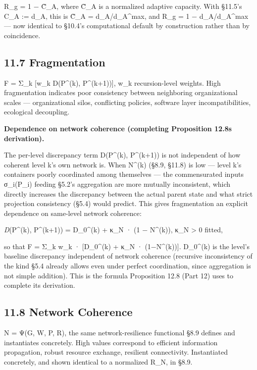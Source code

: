 \documentclass[
]{article}
\begin{document}
R\_g = 1 − C̃\_A, where C̃\_A is a normalized adaptive capacity. With
§11.5's C\_A := d\_A, this is C̃\_A = d\_A/d\_A\^{}max, and R\_g = 1 −
d\_A/d\_A\^{}max --- now identical to §10.4's computational default by
construction rather than by coincidence.

\hypertarget{fragmentation}{%
\subsection{11.7 Fragmentation}\label{fragmentation}}

F = Σ\_k {[}w\_k D(P\^{}(k), P\^{}(k+1)){]}, w\_k recursion-level
weights. High fragmentation indicates poor consistency between
neighboring organizational scales --- organizational silos, conflicting
policies, software layer incompatibilities, ecological decoupling.

\textbf{Dependence on network coherence (completing Proposition
12.8\textquotesingle s derivation).}

The per-level discrepancy term D(P\^{}(k), P\^{}(k+1)) is not
independent of how coherent level k's own network is. When N\^{}(k)
(§8.9, §11.8) is low --- level k's containers poorly coordinated among
themselves --- the commensurated inputs σ\_i(P\_i) feeding §5.2's
aggregation are more mutually inconsistent, which directly increases the
discrepancy between the actual parent state and what strict projection
consistency (§5.4) would predict. This gives fragmentation an explicit
dependence on same-level network coherence:

\emph{D}(P\^{}(k), P\^{}(k+1)) = D\_0\^{}(k) + κ\_N · (1 − N\^{}(k)),
κ\_N \textgreater{} 0 fitted,

so that F = Σ\_k w\_k · {[}D\_0\^{}(k) + κ\_N · (1−N\^{}(k)){]}.
D\_0\^{}(k) is the level's baseline discrepancy independent of network
coherence (recursive inconsistency of the kind §5.4 already allows even
under perfect coordination, since aggregation is not simple addition).
This is the formula Proposition 12.8 (Part 12) uses to complete its
derivation.

\hypertarget{network-coherence}{%
\subsection{11.8 Network Coherence}\label{network-coherence}}

N = Ψ(G, W, P, R), the same network-resilience functional §8.9 defines
and instantiates concretely. High values correspond to efficient
information propagation, robust resource exchange, resilient
connectivity. Instantiated concretely, and shown identical to a
normalized R\_N, in §8.9.
\end{document}
